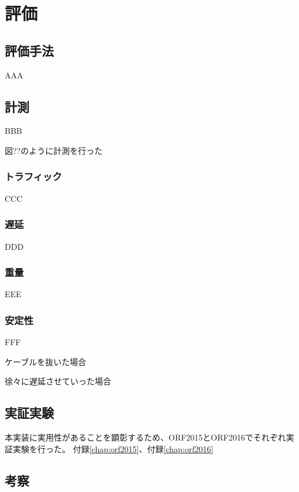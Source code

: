 \chapter{評価}
\label{chap:evaluation}

\section{評価手法}

AAA

\section{計測}

BBB

図??のように計測を行った

\subsection{トラフィック}

CCC

\subsection{遅延}

DDD


\subsection{重量}

EEE

\subsection{安定性}

FFF

ケーブルを抜いた場合

徐々に遅延させていった場合

\section{実証実験}
本実装に実用性があることを顕彰するため、ORF2015とORF2016でそれぞれ実証実験を行った。
付録\ref{chap:orf2015}、付録\ref{chap:orf2016}

\section{考察}
